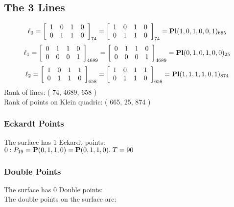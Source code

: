 \documentclass{article}
\newcommand{\bP}{{\bf P}}
\begin{document}
{\subsection*{The 3 Lines}
$$
\ell_{0} = 
\left[
\begin{array}{*{4}{r}}
1 & 0 & 1 & 0\\
0 & 1 & 1 & 0\\
\end{array}
\right]
_{74}
=
\left[
\begin{array}{*{4}c}
1  & 0  & 1  & 0\\
0  & 1  & 1  & 0\\
\end{array}
\right]_{74}
={\rm\bf Pl}(1,0,1,0,0,1 )_{665}$$
$$
\ell_{1} = 
\left[
\begin{array}{*{4}{r}}
0 & 1 & 1 & 0\\
0 & 0 & 0 & 1\\
\end{array}
\right]
_{4689}
=
\left[
\begin{array}{*{4}c}
0  & 1  & 1  & 0\\
0  & 0  & 0  & 1\\
\end{array}
\right]_{4689}
={\rm\bf Pl}(0,1,0,1,0,0 )_{25}$$
$$
\ell_{2} = 
\left[
\begin{array}{*{4}{r}}
1 & 0 & 1 & 1\\
0 & 1 & 1 & 0\\
\end{array}
\right]
_{658}
=
\left[
\begin{array}{*{4}c}
1  & 0  & 1  & 1\\
0  & 1  & 1  & 0\\
\end{array}
\right]_{658}
={\rm\bf Pl}(1,1,1,1,0,1 )_{874}$$
Rank of lines: ( 74, 4689, 658 )\\
Rank of points on Klein quadric: ( 665, 25, 874 )\\
\subsubsection*{Eckardt Points}
The surface has 1 Eckardt points:\\
$0 : P_{19}=\bP(0, 1, 1, 0) = \bP(0, 1, 1, 0).\; T= 90$\\
\subsubsection*{Double Points}
The surface has 0 Double points:\\
The double points on the surface are:\\
\begin{multicols}{2}
\noindent
\end{multicols}
}
\end{document}
